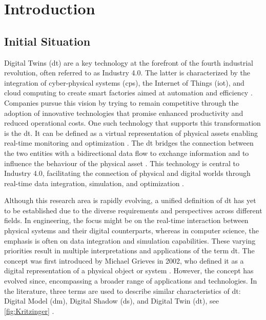 \chapter{Introduction}
\label{chap:introduction}

\section{Initial Situation}
Digital Twins (\gls{dt}) are a key technology at the forefront of the fourth industrial revolution, often referred to as Industry 4.0.
The latter is characterized by the integration of cyber-physical systems (\gls{cps}), the Internet of Things (\gls{iot}), and cloud computing to create smart factories aimed at automation and efficiency \autocite{Oztemel2020}. Companies pursue this vision by trying to remain competitive through the adoption of innovative technologies that promise enhanced productivity and reduced operational costs. One such technology that supports this transformation is the \gls{dt}. It can be defined as a virtual representation of physical assets enabling real-time monitoring and optimization \autocite{Tao2018ijamt}. The \gls{dt} bridges the connection between the two entities with a bidirectional data flow to exchange information and to influence the behaviour of the physical asset \autocite{grieves2014digital}. This technology is central to Industry 4.0, facilitating the connection of physical and digital worlds through real-time data integration, simulation, and optimization \autocite{judijanto2024trends}.

Although this research area is rapidly evolving, a unified definition of \gls{dt} has yet to be established due to the diverse requirements and perspectives across different fields. In engineering, the focus might be on the real-time interaction between physical systems and their digital counterparts, whereas in computer science, the emphasis is often on data integration and simulation capabilities. These varying priorities result in multiple interpretations and applications of the term \gls{dt}. The concept was first introduced by Michael Grieves in 2002, who defined it as a digital representation of a physical object or system \autocite{grieves2014digital}. However, the concept has evolved since, encompassing a broader range of applications and technologies. In the literature, three terms are used to describe similar characteristics of \gls{dt}: Digital Model (\gls{dm}), Digital Shadow (\gls{ds}), and Digital Twin (\gls{dt}), see \autoref{fig:Kritzinger} \autocite{jones2020characterising,Zhang2021jmsy}.

